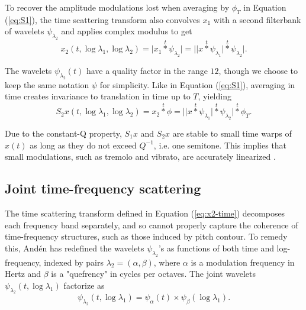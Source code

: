 \documentclass[twoside,a4paper]{article}
\begin{document}
To recover the amplitude modulations lost when averaging by $\phi_T$ in
Equation (\ref{eq:S1}), the time scattering transform also convolves $x_1$ with a second filterbank of wavelets $\psi_{\lambda_2}$ and applies complex modulus to get
\begin{equation}
x_2 (t, \log \lambda_1, \log \lambda_2) =
\vert x_1 \overset{t}{\ast} \psi_{\lambda_2} \vert =
\vert \vert x \overset{t}{\ast} \psi_{\lambda_{1}} \vert
\overset{t}{\ast} \psi_{\lambda_{2}} \vert.
\label{eq:x2-time}
\end{equation}

The wavelets $\psi_{\lambda_2}(t)$ have a quality factor in the range $1$\textendash$2$, though we choose to keep the same notation $\psi$ for simplicity. Like in Equation (\ref{eq:S1}), averaging in time creates invariance to translation in time up to $T$, yielding
\begin{equation}
S_2 x (t, \log \lambda_1, \log \lambda_2) =
x_2 \overset{t}{\ast} \phi =
\vert \vert x \overset{t}{\ast} \psi_{\lambda_{1}} \vert
\overset{t}{\ast} \psi_{\lambda_{2}} \vert
\overset{t}{\ast} \phi_T.
\label{eq:S2-time}
\end{equation}

Due to the constant-Q property, $S_1 x$ and $S_2 x$ are stable to small time warps of $x(t)$ as long as they do not exceed $Q^{-1}$, i.e. one semitone. This implies that small modulations, such as tremolo and vibrato, are accurately linearized \cite{Anden2012, Anden2014DSS}.

\subsection{Joint time-frequency scattering}

The time scattering transform defined in Equation (\ref{eq:x2-time}) decomposes each frequency band separately, and so cannot properly capture the coherence of time-frequency structures, such as those induced by pitch contour. To remedy this, And\'{e}n \cite{Anden2014PhD} has redefined the wavelets $\psi_{\lambda_2}$'s as functions of both time and log-frequency, indexed by pairs $\lambda_2 = (\alpha,\beta)$, where $\alpha$ is a modulation frequency in Hertz and $\beta$ is a "quefrency" in cycles per octaves. The joint wavelets $\psi_{\lambda_2}(t,\log \lambda_1)$ factorize as
\begin{equation}
\psi_{\lambda_2}(t,\log \lambda_1) = \psi_\alpha (t) \times \psi_\beta (\log \lambda_1).
\label{eq:wavelet-joint}
\end{equation}
\end{document}
